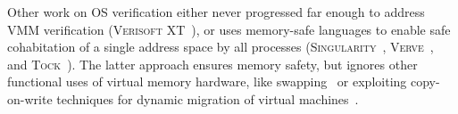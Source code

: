 
Other work on OS verification either never progressed far enough to address VMM verification
(\textsc{Verisoft XT}~\cite{cohen2009vcc,cohen2010local,dahlweid2009vcc,cohen2013SOFSEM}), or uses memory-safe languages to enable safe cohabitation 
of a single address space by all processes (\textsc{Singularity}~\cite{Fahndrich2006language,Hunt2007singularity,Hunt2007sealing,Barnett2011specsharp}, \textsc{Verve}~\cite{Yang2010Verve},
and \textsc{Tock}~\cite{levy2017multiprogramming}). The latter approach ensures memory safety, but ignores other functional uses of virtual memory
hardware, like swapping~\cite{Denning1970VM} or exploiting copy-on-write techniques for dynamic migration of virtual machines~\cite{clark2005live}.

